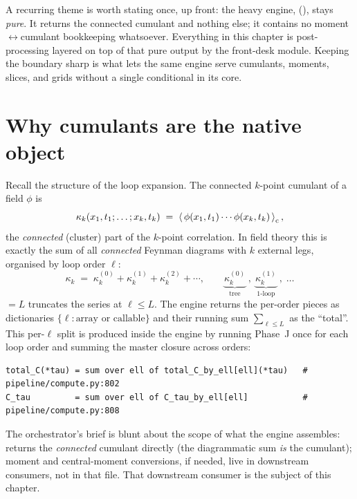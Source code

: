 A recurring theme is worth stating once, up front: the heavy engine,
 (), stays \emph{pure}. It
returns the connected cumulant and nothing else; it contains no
moment$\leftrightarrow$cumulant bookkeeping whatsoever. Everything in this chapter
is post-processing layered on top of that pure output by the front-desk module.
Keeping the boundary sharp is what lets the same engine serve cumulants, moments,
slices, and grids without a single conditional in its core.

\section{Why cumulants are the native object}

Recall the structure of the loop expansion. The connected $k$-point cumulant of
a field $\phi$ is
\begin{equation}
  \kappa_k(x_1,t_1;\ldots;x_k,t_k)
  \;=\; \left\langle \,\phi(x_1,t_1)\cdots\phi(x_k,t_k)\, \right\rangle_{\mathrm c},
  \label{eq:cumulant-def}
\end{equation}
the \emph{connected} (cluster) part of the $k$-point correlation. In \msrjd{}
field theory this is exactly the sum of all \emph{connected} Feynman diagrams
with $k$ external legs, organised by loop order $\ell$:
\begin{equation}
  \kappa_k \;=\; \kappa_k^{(0)} + \kappa_k^{(1)} + \kappa_k^{(2)} + \cdots,
  \qquad
  \underbrace{\kappa_k^{(0)}}_{\text{tree}}\;,\;
  \underbrace{\kappa_k^{(1)}}_{\text{1-loop}}\;,\;\ldots
  \label{eq:cumulant-loops}
\end{equation}
 $=L$ truncates the series at $\ell\le L$. The engine
returns the per-order pieces as  dictionaries
$\{\ell:\text{array or callable}\}$ and their running sum $\sum_{\ell\le L}$ as
the ``total''. This per-$\ell$ split is produced inside the engine by running
Phase~J once for each loop order and summing the master closure across orders:

\begin{lstlisting}[style=console]
total_C(*tau) = sum over ell of total_C_by_ell[ell](*tau)   # pipeline/compute.py:802
C_tau         = sum over ell of C_tau_by_ell[ell]           # pipeline/compute.py:808
\end{lstlisting}

The orchestrator's brief is blunt about the scope of what the engine assembles:
 returns the \emph{connected} cumulant directly (the
diagrammatic sum \emph{is} the cumulant); moment and central-moment conversions,
if needed, live in downstream consumers, not in that file. That downstream
consumer is the subject of this chapter.

